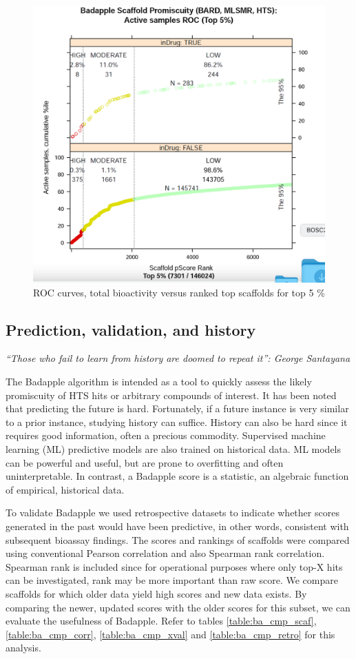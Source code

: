 \begin{figure}
	\includegraphics[width=\textwidth]{figures/badapple/Badapple_Fig4.png}
	\caption{ROC curves, total bioactivity versus ranked top scaffolds for top 5 \%}
	\label{fig:BA_04}
\end{figure}


\subsection{Prediction, validation, and history}

\emph{“Those who fail to learn from history are doomed to repeat it”: George Santayana}

The Badapple algorithm is intended as a tool to quickly assess the likely promiscuity of HTS hits or arbitrary compounds of interest. It has been noted that predicting the future is hard. Fortunately, if a future instance is very similar to a prior instance, studying history can suffice. History can also be hard since it requires good information, often a precious commodity. Supervised machine learning (ML) predictive models are also trained on historical data. ML models can be powerful and useful, but are prone to overfitting and often uninterpretable. In contrast, a Badapple score is a statistic, an algebraic function of empirical, historical data.

To validate Badapple we used retrospective datasets to indicate whether scores generated in the past would have been predictive, in other words, consistent with subsequent bioassay findings. The scores and rankings of scaffolds were compared using conventional Pearson correlation and also Spearman rank correlation. Spearman rank is included since for operational purposes where only top-X hits can be investigated, rank may be more important than raw score. We compare scaffolds for which older data yield high scores and new data exists. By comparing the newer, updated scores with the older scores for this subset, we can evaluate the usefulness of Badapple. Refer to tables \ref{table:ba_cmp_scaf}, \ref{table:ba_cmp_corr}, \ref{table:ba_cmp_xval} and \ref{table:ba_cmp_retro} for this analysis.

